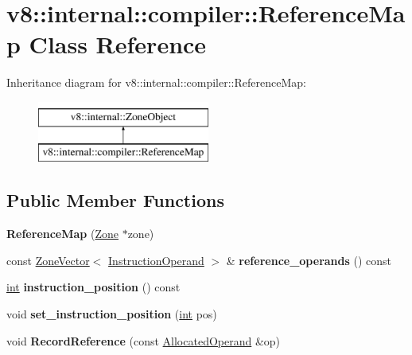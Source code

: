 \hypertarget{classv8_1_1internal_1_1compiler_1_1ReferenceMap}{}\section{v8\+:\+:internal\+:\+:compiler\+:\+:Reference\+Map Class Reference}
\label{classv8_1_1internal_1_1compiler_1_1ReferenceMap}
Inheritance diagram for v8\+:\+:internal\+:\+:compiler\+:\+:Reference\+Map\+:\begin{figure}[H]
\begin{center}
\leavevmode
\includegraphics[height=2.000000cm]{classv8_1_1internal_1_1compiler_1_1ReferenceMap}
\end{center}
\end{figure}
\subsection*{Public Member Functions}
\begin{DoxyCompactItemize}
\item 
\mbox{\label{classv8_1_1internal_1_1compiler_1_1ReferenceMap_a27b779e91f24cb93781104a08321e733}} 
{\bfseries Reference\+Map} (\mbox{\hyperlink{classv8_1_1internal_1_1Zone}{Zone}} $\ast$zone)
\item 
\mbox{\label{classv8_1_1internal_1_1compiler_1_1ReferenceMap_a77c47d7635ce9aada6a961cea4ef91e9}} 
const \mbox{\hyperlink{classv8_1_1internal_1_1ZoneVector}{Zone\+Vector}}$<$ \mbox{\hyperlink{classv8_1_1internal_1_1compiler_1_1InstructionOperand}{Instruction\+Operand}} $>$ \& {\bfseries reference\+\_\+operands} () const
\item 
\mbox{\label{classv8_1_1internal_1_1compiler_1_1ReferenceMap_a7b439c2efcda17ad4f22811195cfd515}} 
\mbox{\hyperlink{classint}{int}} {\bfseries instruction\+\_\+position} () const
\item 
\mbox{\label{classv8_1_1internal_1_1compiler_1_1ReferenceMap_a71a728f68f4e3a4bb12132d7a19062e6}} 
void {\bfseries set\+\_\+instruction\+\_\+position} (\mbox{\hyperlink{classint}{int}} pos)
\item 
\mbox{\label{classv8_1_1internal_1_1compiler_1_1ReferenceMap_a5b72412d4b714cce3d38e65eab31f40e}} 
void {\bfseries Record\+Reference} (const \mbox{\hyperlink{classv8_1_1internal_1_1compiler_1_1AllocatedOperand}{Allocated\+Operand}} \&op)
\end{DoxyCompactItemize}
